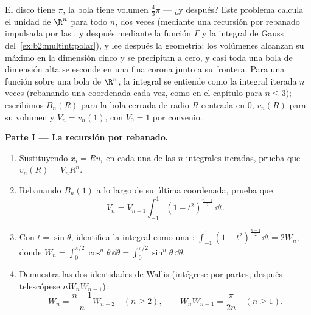 \begin{problem}[{Problema de fin de semana --- $V_n =
\pi^{n/2}/\Gamma(\frac n2 + 1)$, y la rareza de las dimensiones
altas}]\label{pb:b2:multint:1}
El disco tiene  $\pi$, la bola tiene volumen $\frac43\pi$ --- ¿y
después? Este problema calcula el  unidad de $\R^n$
para todo $n$, dos veces (mediante una recursión por rebanado
impulsada por las , y después mediante la
función $\Gamma$ y la integral de Gauss del~\cref{ex:b2:multint:polar}), y lee después la geometría: los
volúmenes alcanzan su máximo en la dimensión cinco y se precipitan a
cero, y casi toda una bola de dimensión alta se esconde en una fina
corona junto a su frontera. Para una función  sobre una bola de $\R^n$, la
integral se entiende como la integral iterada $n$ veces (rebanando
una coordenada cada vez, como en el capítulo para $n \leq 3$);
escribimos $B_n(R)$ para la bola cerrada de radio $R$ centrada en
$0$, $v_n(R)$ para su volumen y $V_n = v_n(1)$, con $V_0 = 1$ por
convenio.

\medskip
\noindent\textbf{Parte I --- La recursión por rebanado.}
\begin{enumerate}
  \item Sustituyendo $x_i = Ru_i$ en cada una de las $n$ integrales
        iteradas, prueba que $v_n(R) = V_nR^n$.
  \item Rebanando $B_n(1)$ a lo largo de su última coordenada, prueba
        que
        \[
        V_n = V_{n-1}\int_{-1}^{1}(1 -
        t^2)^{\frac{n-1}2}\,\dd t .
        \]
  \item Con $t = \sin\theta$, identifica la integral como una
        : $\int_{-1}^1(1 - t^2)^{\frac{n-1}2}\dd t
        = 2W_n$, donde $W_n = \int_0^{\pi/2}\cos^n\theta\,\dd\theta =
        \int_0^{\pi/2}\sin^n\theta\,\dd\theta$.
  \item Demuestra las dos identidades de Wallis (intégrese por
        partes; después telescópese $nW_nW_{n-1}$):
        \[
        W_n = \frac{n-1}nW_{n-2} \quad (n \geq 2),
        \qquad
        W_nW_{n-1} = \frac{\pi}{2n} \quad (n \geq 1).
        \]
\end{enumerate}


\end{problem}

